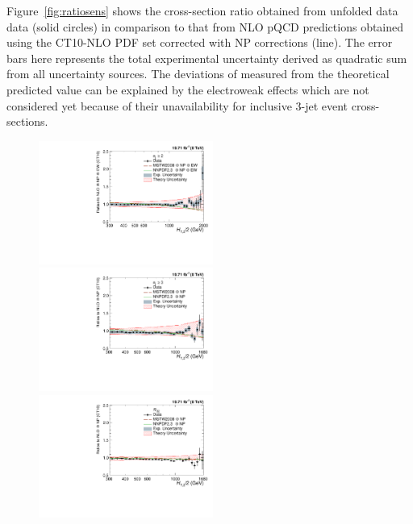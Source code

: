 Figure~\ref{fig:ratiosens} shows the cross-section ratio \ratio obtained from unfolded data data (solid circles) in comparison to that from NLO pQCD predictions obtained using the CT10-NLO PDF set corrected with NP corrections (line). The error bars here represents the total experimental uncertainty derived as quadratic sum from all uncertainty sources. The deviations of measured \ratio from the theoretical predicted value can be explained by the electroweak effects which are not considered yet because of their unavailability for inclusive 3-jet event cross-sections.

\begin{figure}[!ht]
 \begin{center}
 \hspace*{-5mm}\includegraphics[width=0.51\textwidth]{Plots_HT_2_150/Comparison_data_NLO_Pdfs_2_EW.pdf}%
 ~~\includegraphics[width=0.51\textwidth]{Plots_HT_2_150/Comparison_data_NLO_Pdfs_3.pdf}\\
 \includegraphics[width=0.51\textwidth]{Plots_HT_2_150/Comparison_data_NLO_Pdfs_ratio_32.pdf}\\

\end{center}
\end{figure}
